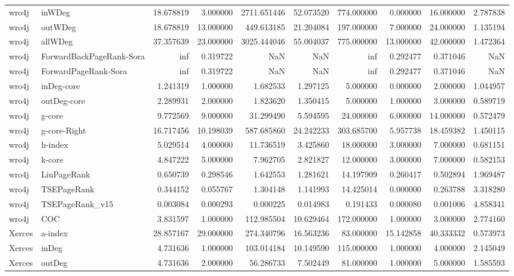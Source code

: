 \begin{tabular}{llrrrrrrrr}
wro4j & inWDeg & 18.678819 & 3.000000 & 2711.651446 & 52.073520 & 774.000000 & 0.000000 & 16.000000 & 2.787838 \\
wro4j & outWDeg & 18.678819 & 13.000000 & 449.613185 & 21.204084 & 197.000000 & 7.000000 & 24.000000 & 1.135194 \\
wro4j & allWDeg & 37.357639 & 23.000000 & 3025.444046 & 55.004037 & 775.000000 & 13.000000 & 42.000000 & 1.472364 \\
wro4j & ForwardBackPageRank-Sora & inf & 0.319722 & NaN & NaN & inf & 0.292477 & 0.371046 & NaN \\
wro4j & ForwardPageRank-Sora & inf & 0.319722 & NaN & NaN & inf & 0.292477 & 0.371046 & NaN \\
wro4j & inDeg-core & 1.241319 & 1.000000 & 1.682533 & 1.297125 & 5.000000 & 0.000000 & 2.000000 & 1.044957 \\
wro4j & outDeg-core & 2.289931 & 2.000000 & 1.823620 & 1.350415 & 5.000000 & 1.000000 & 3.000000 & 0.589719 \\
wro4j & g-core & 9.772569 & 9.000000 & 31.299490 & 5.594595 & 24.000000 & 6.000000 & 14.000000 & 0.572479 \\
wro4j & g-core-Right & 16.717456 & 10.198039 & 587.685860 & 24.242233 & 303.685700 & 5.957738 & 18.459382 & 1.450115 \\
wro4j & h-index & 5.029514 & 4.000000 & 11.736519 & 3.425860 & 18.000000 & 3.000000 & 7.000000 & 0.681151 \\
wro4j & k-core & 4.847222 & 5.000000 & 7.962705 & 2.821827 & 12.000000 & 3.000000 & 7.000000 & 0.582153 \\
wro4j & LiuPageRank & 0.650739 & 0.298546 & 1.642553 & 1.281621 & 14.197909 & 0.260417 & 0.502894 & 1.969487 \\
wro4j & TSEPageRank & 0.344152 & 0.055767 & 1.304148 & 1.141993 & 14.425014 & 0.000000 & 0.263788 & 3.318280 \\
wro4j & TSEPageRank_v15 & 0.003084 & 0.000293 & 0.000225 & 0.014983 & 0.191433 & 0.000080 & 0.001006 & 4.858341 \\
wro4j & COC & 3.831597 & 1.000000 & 112.985504 & 10.629464 & 172.000000 & 1.000000 & 3.000000 & 2.774160 \\
Xerces & a-index & 28.857167 & 29.000000 & 274.340796 & 16.563236 & 83.000000 & 15.142858 & 40.333332 & 0.573973 \\
Xerces & inDeg & 4.731636 & 1.000000 & 103.014184 & 10.149590 & 115.000000 & 1.000000 & 4.000000 & 2.145049 \\
Xerces & outDeg & 4.731636 & 2.000000 & 56.286733 & 7.502449 & 81.000000 & 1.000000 & 5.000000 & 1.585593 \\

\end{tabular}
